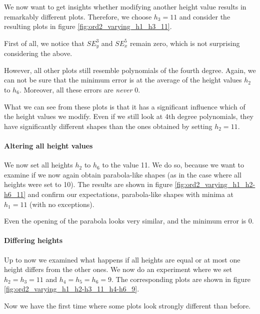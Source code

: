 \documentclass[a4paper, twoside]{article}
\begin{document}
We now want to get insights whether modifying another height value results in remarkably different plots. Therefore, we choose $h_3=11$ and consider the resulting plots in figure \ref{fig:ord2_varying_h1_h3_11}.



First of all, we notice that $SE_y^3$ and $SE_x^5$ remain zero, which is not surprising considering the above.

However, all other plots still resemble polynomials of the fourth degree. Again, we can not be sure that the minimum error is at the average of the height values $h_2$ to $h_6$. Moreover, all these errors are \emph{never} 0.

What we can see from these plots is that it has a significant influence which of the height values we modify. Even if we still look at 4th degree polynomials, they have significantly different shapes than the ones obtained by setting $h_2=11$.

\paragraph{Altering all height values}

We now set all heights $h_2$ to $h_6$ to the value 11. We do so, because we want to examine if we now again obtain parabola-like shapes (as in the case where all heights were set to 10). The results are shown in figure \ref{fig:ord2_varying_h1_h2-h6_11} and confirm our expectations, parabola-like shapes with minima at $h_1=11$ (with no exceptions).



Even the opening of the parabola looks very similar, and the minimum error is 0.

\paragraph{Differing heights}

Up to now we examined what happens if all heights are equal or at most one height differs from the other ones. We now do an experiment where we set $h_2=h_3=11$ and $h_4=h_5=h_6=9$. The corresponding plots are shown in figure \ref{fig:ord2_varying_h1_h2-h3_11_h4-h6_9}.



Now we have the first time where some plots look strongly different than before.
\end{document}
